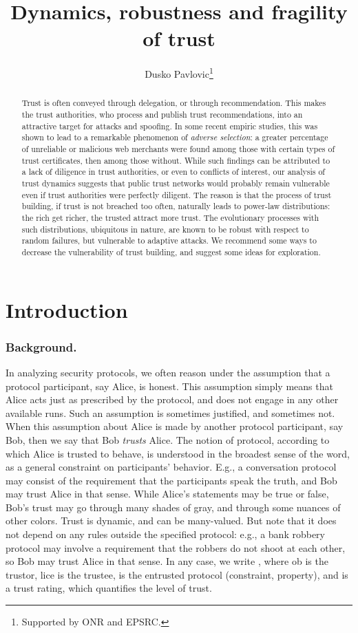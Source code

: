 \documentclass{llncs}
\title{Dynamics, robustness and fragility of trust}
\author{\author{Dusko Pavlovic\thanks{Supported by ONR and EPSRC.}\\\institute{Kestrel Institute and
Oxford University}
\email{\small Email:~dusko\char64\{kestrel.edu,comlab.ox.ac.uk\}}}
}
\begin{document}
\maketitle

\begin{abstract}
Trust is often conveyed through delegation, or through recommendation. This makes the trust authorities, who process and publish trust recommendations, into an attractive target for attacks and spoofing. In some recent empiric studies, this was shown to lead to a remarkable phenomenon of {\em adverse selection}: a greater percentage of unreliable or malicious web merchants were found among those with certain types of trust certificates, then among those without. While such findings can be attributed to a lack of diligence in trust authorities, or even to conflicts of interest, our analysis of trust dynamics suggests that public trust networks would probably remain vulnerable even if trust authorities were perfectly diligent. The reason is that the process of trust building, if trust is not breached too often, naturally leads to power-law distributions: the rich get richer, the trusted attract more trust. The evolutionary processes with such distributions, ubiquitous in nature, are known to be robust with respect to random failures, but vulnerable to adaptive attacks. 
We recommend some ways to decrease the vulnerability of trust building, and suggest some ideas for exploration. 
\end{abstract}

\section{Introduction}
\subsubsection*{Background.}
In analyzing security protocols, we often reason under the assumption that a protocol participant, say Alice, is honest. This assumption simply means that Alice acts just as prescribed by the protocol, and does not engage in any other available runs. Such an assumption is sometimes justified, and sometimes not. When this assumption about Alice is made by another protocol participant, say Bob, then we say that Bob {\em trusts\/} Alice. The notion of protocol, according to which Alice is trusted to behave, is understood in the broadest sense of the word, as a general constraint on participants' behavior. E.g., a conversation protocol may consist of the requirement that the participants speak the truth, and Bob may trust Alice in that sense. While Alice's statements may be true or false, Bob's trust may go through many shades of gray, and through some nuances of other colors. Trust is dynamic, and can be many-valued. But note that it does not depend on any rules outside the specified protocol: e.g., a bank robbery protocol may involve a requirement that the robbers do not shoot at each other, so Bob may trust Alice in that sense. In any case, we write , where ob is the trustor, lice is the trustee,  is the entrusted protocol (constraint, property), and  is a trust rating, which quantifies the level of trust.
\end{document}
